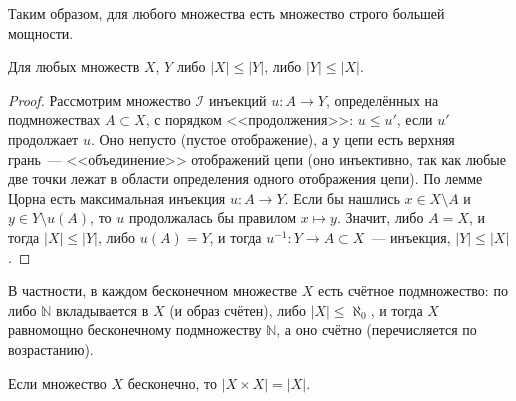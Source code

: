 Таким образом, для любого множества есть множество строго большей мощности.

\begin{lemma}
Для любых множеств $X$, $Y$ либо $|X|\le|Y|$, либо $|Y|\le|X|$.
\end{lemma}

\begin{proof}
Рассмотрим множество $\mathcal I$ инъекций $u\colon A\to Y$, определённых на подмножествах $A\subset X$, с порядком
<<продолжения>>: $u\le u'$, если $u'$ продолжает $u$. Оно непусто (пустое отображение), а у цепи есть верхняя грань~---
<<объединение>> отображений цепи (оно инъективно, так как любые две точки лежат в области определения одного
отображения цепи). По лемме Цорна есть максимальная инъекция $u\colon A\to Y$. Если бы нашлись $x\in X\setminus A$ и
$y\in Y\setminus u(A)$, то $u$ продолжалась бы правилом $x\mapsto y$. Значит, либо $A=X$, и тогда $|X|\le|Y|$, либо
$u(A)=Y$, и тогда $u^{-1}\colon Y\to A\subset X$~--- инъекция, $|Y|\le|X|$.
\end{proof}

В частности, в каждом бесконечном множестве $X$ есть счётное подмножество: по  либо $\mathbb N$ вкладывается в $X$
(и образ счётен), либо $|X|\le\aleph_0$, и тогда $X$ равномощно бесконечному подмножеству $\mathbb N$, а оно счётно
(перечисляется по возрастанию).

\begin{theorem}[6.4f]
Если множество $X$ бесконечно, то $|X\times X|=|X|$.
\end{theorem}

